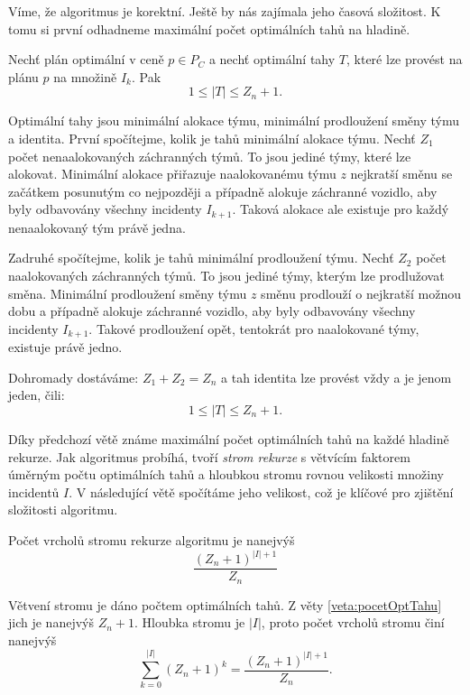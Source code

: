 Víme, že algoritmus je korektní. Ještě by nás zajímala jeho časová složitost.
K tomu si první odhadneme maximální počet optimálních tahů na hladině.
\begin{veta}\label{veta:pocetOptTahu}
  Nechť plán optimální v ceně $p \in P_C$ a nechť optimální tahy $T$, které lze provést na plánu $p$ na množině $I_k$.
  Pak
  \begin{equation*}
    1 \leq |T| \leq Z_n + 1.
  \end{equation*}
\end{veta}
\begin{dukaz}
  Optimální tahy jsou minimální alokace týmu, minimální prodloužení směny týmu a identita.
  První spočítejme, kolik je tahů minimální alokace týmu.
  Nechť $Z_1$ počet nenaalokovaných záchranných týmů.
  To jsou jediné týmy, které lze alokovat.
  Minimální alokace přiřazuje naalokovanému týmu $z$ nejkratší směnu se začátkem posunutým co nejpozději a případně alokuje záchranné vozidlo,
  aby byly odbavovány všechny incidenty $I_{k+1}$.
  Taková alokace ale existuje pro každý nenaalokovaný tým právě jedna.

  Zadruhé spočítejme, kolik je tahů minimální prodloužení týmu.
  Nechť $Z_2$ počet naalokovaných záchranných týmů.
  To jsou jediné týmy, kterým lze prodlužovat směna.
  Minimální prodloužení směny týmu $z$ směnu prodlouží o nejkratší možnou dobu a případně alokuje záchranné vozidlo,
  aby byly odbavovány všechny incidenty $I_{k+1}$.
  Takové prodloužení opět, tentokrát pro naalokované týmy, existuje právě jedno.

  Dohromady dostáváme: $Z_1 + Z_2 = Z_n$ a tah identita lze provést vždy a je jenom jeden, čili:
  \begin{equation*}
    1 \leq |T| \leq Z_n + 1.
  \end{equation*}
\end{dukaz}

Díky předchozí větě známe maximální počet optimálních tahů na každé hladině rekurze. Jak algoritmus probíhá,
tvoří \textit{strom rekurze} s větvícím faktorem úměrným počtu optimálních tahů a hloubkou stromu rovnou velikosti množiny incidentů $I$.
V následující větě spočítáme jeho velikost, což je klíčové pro zjištění složitosti algoritmu.
\begin{veta}\label{veta:velikostStromuR}
Počet vrcholů stromu rekurze algoritmu je nanejvýš
  \begin{equation*}
    \frac{(Z_n + 1)^{|I| + 1}}{Z_n}
  \end{equation*}
\end{veta}
\begin{dukaz}
  Větvení stromu je dáno počtem optimálních tahů.
  Z věty \ref{veta:pocetOptTahu} jich je nanejvýš $Z_n + 1$.
  Hloubka stromu je $|I|$, proto
  počet vrcholů stromu činí nanejvýš
  \begin{equation*}
    \sum_{k=0}^{|I|} (Z_n + 1)^{k} = \frac{(Z_n + 1)^{|I| + 1}}{Z_n}.
  \end{equation*}
\end{dukaz}

